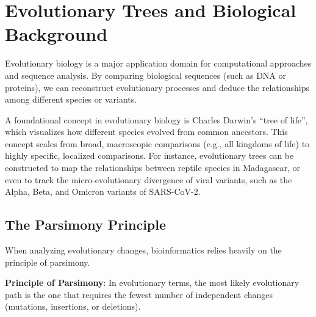 


\section{Evolutionary Trees and Biological Background}

Evolutionary biology is a major application domain for computational approaches and sequence analysis. By comparing biological sequences (such as DNA or proteins), we can reconstruct evolutionary processes and deduce the relationships among different species or variants. 

A foundational concept in evolutionary biology is Charles Darwin's ``tree of life'', which visualizes how different species evolved from common ancestors. This concept scales from broad, macroscopic comparisons (e.g., all kingdoms of life) to highly specific, localized comparisons. For instance, evolutionary trees can be constructed to map the relationships between reptile species in Madagascar, or even to track the micro-evolutionary divergence of viral variants, such as the Alpha, Beta, and Omicron variants of SARS-CoV-2.




\subsection{The Parsimony Principle}

When analyzing evolutionary changes, bioinformatics relies heavily on the principle of parsimony.

\begin{important}
    \textbf{Principle of Parsimony}: In evolutionary terms, the most likely evolutionary path is the one that requires the fewest number of independent changes (mutations, insertions, or deletions).
\end{important}

